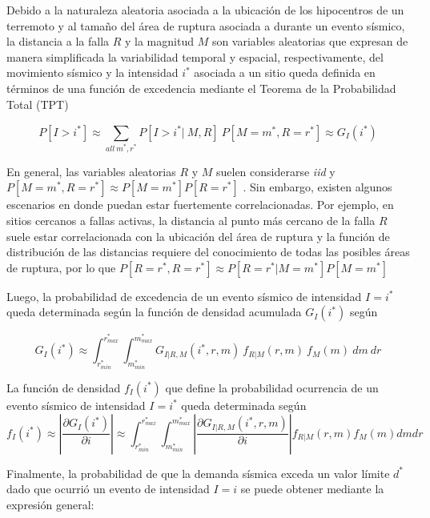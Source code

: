\documentclass[
]{krantz}
\begin{document}
Debido a la naturaleza aleatoria asociada a la ubicación de los hipocentros de un terremoto y al tamaño del área de ruptura asociada a durante un evento sísmico, la distancia a la falla \(R\) y la magnitud \(M\) son variables aleatorias que expresan de manera simplificada la variabilidad temporal y espacial, respectivamente, del movimiento sísmico y la intensidad \(i^*\) asociada a un sitio queda definida en términos de una función de excedencia mediante el Teorema de la Probabilidad Total (TPT)

\[ \begin{equation} 
P\left [ I>i^* \right ] \approx \sum^{}_{all\  m^{\ast},r^{\ast}}  P\left [I > i^*|\ M,R \right ] \ P\left [M=m^*,R=r^*  \right ] \approx G_I(i^*)
\end{equation}\]

En general, las variables aleatorias \(R\) y \(M\) suelen considerarse \emph{iid} y \(P\left [M=m^*,R=r^* \right ] \approx P\left [M=m^*\right ] P\left [R=r^*\right ]\) . Sin embargo, existen algunos escenarios en donde puedan estar fuertemente correlacionadas. Por ejemplo, en sitios cercanos a fallas activas, la distancia al punto más cercano de la falla \(R\) suele estar correlacionada con la ubicación del área de ruptura y la función de distribución de las distancias requiere del conocimiento de todas las posibles áreas de ruptura, por lo que \(P\left [R=r^*,R=r^* \right ] \approx P\left [R=r^*|M=m^*\right ] P\left [M=m^*\right ]\)

Luego, la probabilidad de excedencia de un evento sísmico de intensidad \(I=i^*\) queda determinada según la función de densidad acumulada \(G_I(i^*)\) según

\[ \begin{equation}  G_I(i^*) \approx \int^{r_{max}^*}_{r_{min}^*}  \int^{m_{max}^*}_{m_{min}^*} G_{I|R,M}(i^*,r,m) \ f_{R|M}(r,m) \ f_M(m) \ dm \ dr 
\end{equation}\]

La función de densidad \(f_I(i^*)\) que define la probabilidad ocurrencia de un evento sísmico de intensidad \(I=i^*\) queda determinada según \[ f_I(i^*) \approx \left|\frac{\partial G_I(i^*)}{\partial i}\right | \approx \int^{r_{max}^*}_{r_{min}^*}  \int^{m_{max}^*}_{m_{min}^*} \left|\frac{\partial G_{I|R,M}(i^*,r,m)}{\partial i} \right| f_{R|M}(r,m)  f_M(m)  dm dr  \]

Finalmente, la probabilidad de que la demanda sísmica exceda un valor límite \(d^*\) dado que ocurrió un evento de intensidad \(I=i\) se puede obtener mediante la expresión general:
\end{document}
